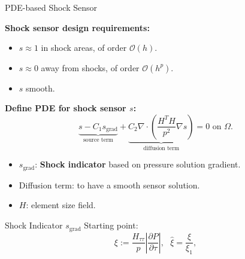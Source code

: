 \documentclass{beamer}
\newcounter{sectionframecount}
\begin{document}
\begin{frame}[t]{PDE-based Shock Sensor\footnotemark}
\vspace{-10pt}

\textbf{Shock sensor design requirements:}
\begin{itemize}
    \item $s \approx 1$ in shock areas, of order $\mathcal{O}(h)$.
    \item $s \approx 0$ away from shocks, of order $\mathcal{O}(h^p)$.
    \item $s$ smooth.
\end{itemize}
\textbf{Define PDE for shock sensor $s$:}
\begin{equation}
  \underbrace{s - C_1s_{\text{grad}}}_{\text{source term}} + \underbrace{C_2\nabla \cdot \left(\dfrac{H^TH}{p^2} \nabla s\right)}_{\text{diffusion term}} = 0\text{ on }\Omega.
	\label{e:sensor_source}
\end{equation}

\begin{itemize}
  \item $s_{\text{grad}}$: \textbf{Shock indicator} based on pressure solution gradient.
  \item Diffusion term: to have a smooth sensor solution.
  \item $H$: element size field.
\end{itemize}

\end{frame}


\begin{frame}[t]{Shock Indicator $s_{\text{grad}}$}
  Starting point:
  \begin{equation}
    \xi := \dfrac{H_{\tau\tau}}{p} \left|\dfrac{\partial P}{\partial \tau}\right|,~~~\hat{\xi} = \dfrac{\xi}{\xi_1},
  \end{equation}
\end{frame}
\end{document}
